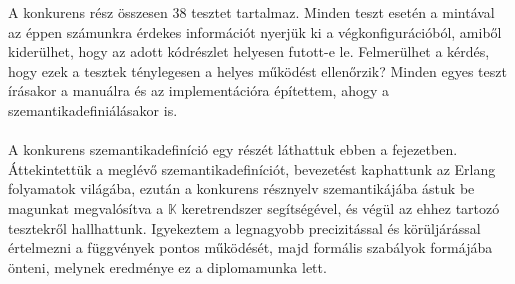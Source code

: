 A konkurens rész összesen 38 tesztet tartalmaz. Minden teszt esetén a mintával az éppen számunkra érdekes információt nyerjük ki a végkonfigurációból, amiből kiderülhet, hogy az adott kódrészlet helyesen futott-e le. Felmerülhet a kérdés, hogy ezek a tesztek ténylegesen a helyes működést ellenőrzik? Minden egyes teszt írásakor a manuálra és az implementációra építettem, ahogy a szemantikadefiniálásakor is.

\paragraph{}
A konkurens szemantikadefiníció egy részét láthattuk ebben a fejezetben. Áttekintettük a meglévő szemantikadefiníciót, bevezetést kaphattunk az Erlang folyamatok világába, ezután a konkurens résznyelv szemantikájába ástuk be magunkat megvalósítva a $\mathbb{K}$ keretrendszer segítségével, és végül az ehhez tartozó tesztekről hallhattunk. Igyekeztem a legnagyobb precizitással és körüljárással értelmezni a függvények pontos működését, majd formális szabályok formájába önteni, melynek eredménye ez a diplomamunka lett.

